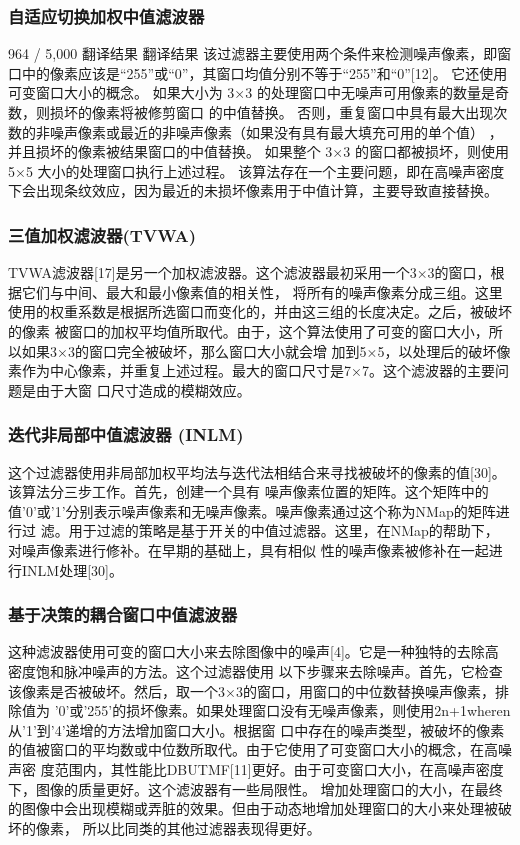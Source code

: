 \documentclass[12pt]{article} %
\begin{document}
\subsubsection{自适应切换加权中值滤波器}
964 / 5,000
翻译结果
翻译结果
该过滤器主要使用两个条件来检测噪声像素，即窗口中的像素应该是“255”或“0”，其窗口均值分别不等于“255”和“0”[12]。
 它还使用可变窗口大小的概念。 如果大小为 3×3 的处理窗口中无噪声可用像素的数量是奇数，则损坏的像素将被修剪窗口
 的中值替换。 否则，重复窗口中具有最大出现次数的非噪声像素或最近的非噪声像素（如果没有具有最大填充可用的单个值）
 ，并且损坏的像素被结果窗口的中值替换。 如果整个 3×3 的窗口都被损坏，则使用 5×5 大小的处理窗口执行上述过程。 
 该算法存在一个主要问题，即在高噪声密度下会出现条纹效应，因为最近的未损坏像素用于中值计算，主要导致直接替换。

\subsubsection{三值加权滤波器(TVWA)}
 TVWA滤波器[17]是另一个加权滤波器。这个滤波器最初采用一个3×3的窗口，根据它们与中间、最大和最小像素值的相关性，
 将所有的噪声像素分成三组。这里使用的权重系数是根据所选窗口而变化的，并由这三组的长度决定。之后，被破坏的像素
 被窗口的加权平均值所取代。由于，这个算法使用了可变的窗口大小，所以如果3×3的窗口完全被破坏，那么窗口大小就会增
 加到5×5，以处理后的破坏像素作为中心像素，并重复上述过程。最大的窗口尺寸是7×7。这个滤波器的主要问题是由于大窗
 口尺寸造成的模糊效应。

\subsubsection{迭代非局部中值滤波器 (INLM)}
 这个过滤器使用非局部加权平均法与迭代法相结合来寻找被破坏的像素的值[30]。该算法分三步工作。首先，创建一个具有
 噪声像素位置的矩阵。这个矩阵中的值'0'或'1'分别表示噪声像素和无噪声像素。噪声像素通过这个称为NMap的矩阵进行过
 滤。用于过滤的策略是基于开关的中值过滤器。这里，在NMap的帮助下，对噪声像素进行修补。在早期的基础上，具有相似
 性的噪声像素被修补在一起进行INLM处理[30]。

\subsubsection{基于决策的耦合窗口中值滤波器}
这种滤波器使用可变的窗口大小来去除图像中的噪声[4]。它是一种独特的去除高密度饱和脉冲噪声的方法。这个过滤器使用
以下步骤来去除噪声。首先，它检查该像素是否被破坏。然后，取一个3×3的窗口，用窗口的中位数替换噪声像素，排除值为
'0'或'255'的损坏像素。如果处理窗口没有无噪声像素，则使用2n+1wheren从'1'到'4'递增的方法增加窗口大小。根据窗
口中存在的噪声类型，被破坏的像素的值被窗口的平均数或中位数所取代。由于它使用了可变窗口大小的概念，在高噪声密
度范围内，其性能比DBUTMF[11]更好。由于可变窗口大小，在高噪声密度下，图像的质量更好。这个滤波器有一些局限性。
增加处理窗口的大小，在最终的图像中会出现模糊或弄脏的效果。但由于动态地增加处理窗口的大小来处理被破坏的像素，
所以比同类的其他过滤器表现得更好。
\end{document}
